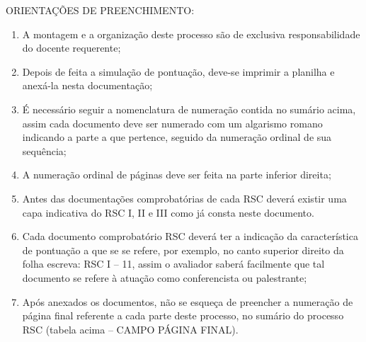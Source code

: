 {\color{red}
ORIENTAÇÕES DE PREENCHIMENTO:
\begin{enumerate}
	\itemsep-1em
	\item A montagem e a organização deste processo são de exclusiva responsabilidade do docente requerente;
	\item Depois de feita a simulação de pontuação, deve-se imprimir a planilha e anexá-la nesta documentação;
	\item É necessário seguir a nomenclatura de numeração contida no sumário acima, assim cada documento deve ser numerado com um algarismo romano indicando a parte a que pertence, seguido da numeração ordinal de sua sequência; 
	\item A numeração ordinal de páginas deve ser feita na parte inferior direita;
	\item Antes das documentações comprobatórias de cada RSC deverá existir uma capa indicativa do RSC I, II e III como já consta neste documento.
	\item Cada documento comprobatório RSC deverá ter a indicação da característica de pontuação a que se se refere, por exemplo, no canto superior direito da folha escreva: RSC I – 11, assim o avaliador saberá facilmente que tal documento se refere à atuação como conferencista ou palestrante;
	\item Após anexados os documentos, não se esqueça de preencher a numeração de página final referente a cada parte deste processo, no sumário do processo RSC (tabela acima – CAMPO PÁGINA FINAL).
\end{enumerate}
}
